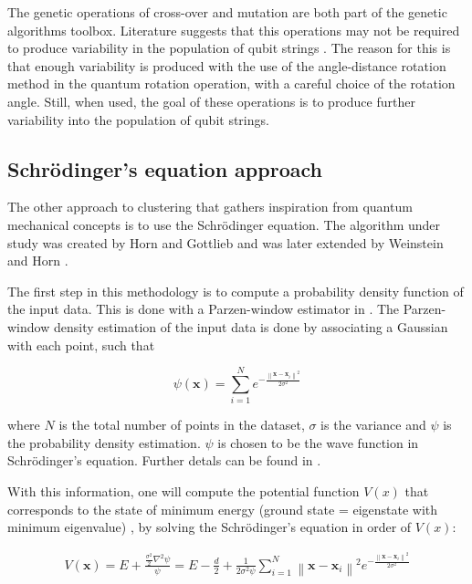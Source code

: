 The genetic operations of cross-over and mutation are both part of the genetic algorithms toolbox.
Literature suggests that this operations may not be required to produce variability in the population of qubit strings \cite{Liu2010}.
The reason for this is that enough variability is produced with the use of the angle-distance rotation method \cite{Liu2010} in the quantum rotation operation, with a careful choice of the rotation angle.
Still, when used, the goal of these operations is to produce further variability into the population of qubit strings.

\subsection{Schrödinger's equation approach} %
\label{sec:horn}

The other approach to clustering that gathers inspiration from quantum mechanical concepts is to use the Schrödinger equation.
The algorithm under study was created by Horn and Gottlieb \cite{Horn2010} and was later extended by Weinstein and Horn \cite{Weinstein2009}.

The first step in this methodology is to compute a probability density function of the input data.
This is done with a Parzen-window estimator in \cite{Horn2001a,Weinstein2009}.
The Parzen-window density estimation of the input data is done by associating a Gaussian with each point, such that

$$ \psi (\mathbf{x}) = \sum ^N _{i=1} e^{- \frac{\left \| \mathbf{x}-\mathbf{x}_i \right \| ^2}{2 \sigma ^2}} $$

where $N$ is the total number of points in the dataset, $\sigma$ is the variance and $\psi$ is the probability density estimation. $\psi$ is chosen to be the wave function in Schrödinger's equation.
Further detals can be found in \citet{Weinstein2009,Horn2001a,Horn2001b}.

With this information, one will compute the potential function $V(x)$ that corresponds to the state of minimum energy (ground state = eigenstate with minimum eigenvalue) \cite{Horn2001a}, by solving the Schrödinger's equation in order of $V(x)$:      

\begin{align}
V \left ( \mathbf{x} \right ) = E + \frac {\frac{\sigma^2}{2}\nabla^2 \psi }{\psi}
= E - \frac{d}{2} + \frac {1}{2 \sigma^2 \psi} \sum ^N _{i=1} \left \| \mathbf{x}-\mathbf{x}_i \right \| ^2 e^{- \frac{\left \| \mathbf{x}-\mathbf{x}_i \right \| ^2}{2 \sigma ^2}}
\label{eq:wave}
\end{align}

